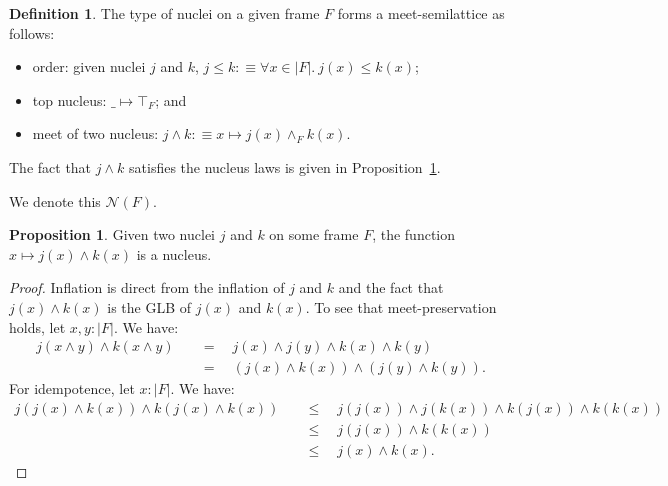 \documentclass[a4paper, 10pt]{article}
\theoremstyle{definition}
\newtheorem{prop}{Proposition}
\newtheorem{defn}{Definition}
\begin{document}
\begin{defn}\label{defn:nuclei-semilattice}
  The type of nuclei on a given frame $F$ forms a meet-semilattice as follows:
  \begin{itemize}
    \item order: given nuclei $j$ and $k$, $j \le k :\equiv \forall x \in | F |.\ j(x) \le k(x)$;
    \item top nucleus: $\_ \mapsto \top_F$; and
    \item meet of two nucleus: $j \wedge k :\equiv x \mapsto j(x) \wedge_F k(x)$.
  \end{itemize}
  The fact that $j \wedge k$ satisfies the nucleus laws is given in Proposition~\ref{prop:nuclei-meet}.
\end{defn}

We denote this $\mathcal{N}(F)$.

\begin{prop}\label{prop:nuclei-meet}
  Given two nuclei $j$ and $k$ on some frame $F$, the function $x \mapsto j(x) \wedge k(x)$ is a nucleus.
\end{prop}
\begin{proof}
  Inflation is direct from the inflation of $j$ and $k$ and the fact that $j(x) \wedge k(x)$ is the GLB
  of $j(x)$ and $k(x)$. To see that meet-preservation holds, let $x, y : | F |$. We have:
  \begin{align*}
    j (x \wedge y) \wedge k (x \wedge y) &\quad=\quad j(x) \wedge j(y) \wedge k(x) \wedge k(y) \\
                          &\quad=\quad (j(x) \wedge k(x)) \wedge (j(y) \wedge k(y)).
  \end{align*}
  For idempotence, let $x : | F |$. We have:
  \begin{align*}
    j (j(x) \wedge k(x)) \wedge k(j(x) \wedge k(x)) &\quad\le\quad j(j(x)) \wedge j(k(x)) \wedge k(j(x)) \wedge k(k(x)) \\
                                     &\quad\le\quad j(j(x)) \wedge k(k(x)) & \\
                                     &\quad\le\quad j(x) \wedge k(x).
  \end{align*}
\end{proof}
\end{document}
